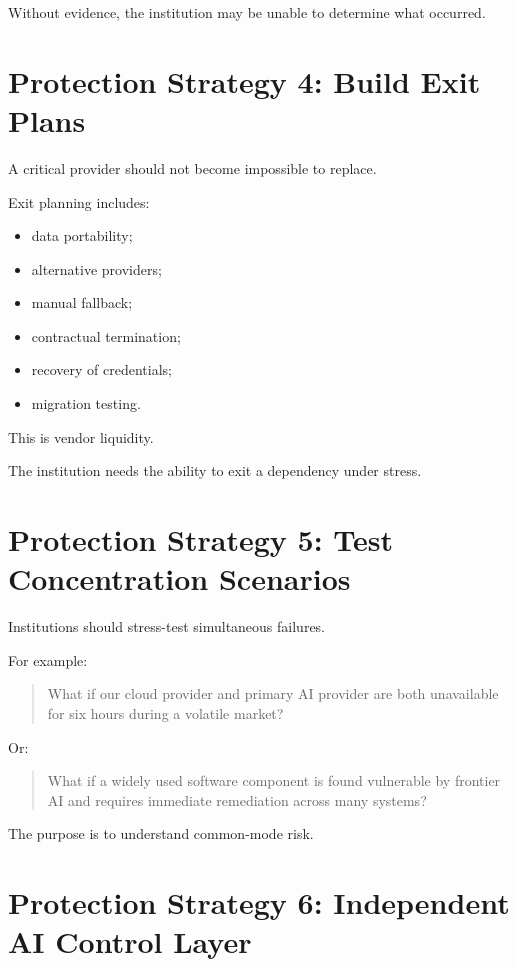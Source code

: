 Without evidence, the institution may be unable to determine what occurred.

\section{Protection Strategy 4: Build Exit Plans}

A critical provider should not become impossible to replace.

Exit planning includes:

\begin{itemize}
    \item data portability;
    \item alternative providers;
    \item manual fallback;
    \item contractual termination;
    \item recovery of credentials;
    \item migration testing.
\end{itemize}

This is vendor liquidity.

The institution needs the ability to exit a dependency under stress.

\section{Protection Strategy 5: Test Concentration Scenarios}

Institutions should stress-test simultaneous failures.

For example:

\begin{quote}
What if our cloud provider and primary AI provider are both unavailable for six hours during a volatile market?
\end{quote}

Or:

\begin{quote}
What if a widely used software component is found vulnerable by frontier AI and requires immediate remediation across many systems?
\end{quote}

The purpose is to understand common-mode risk.

\section{Protection Strategy 6: Independent AI Control Layer}

